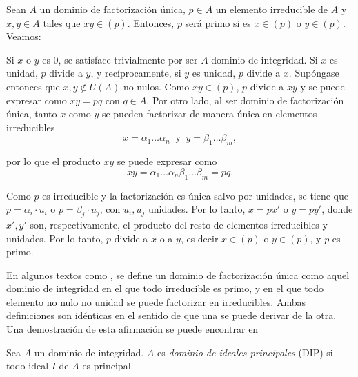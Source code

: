 \begin{prop}\end{prop}
\begin{dem}{\cite[p.~38]{Rosenberger}}
    Sean $A$ un dominio de factorización única, $p\in A$ un elemento irreducible de $A$ y $x,y\in A$ tales que $xy \in (p)$. Entonces, $p$ será primo si es $x \in (p)$ o $y \in (p)$. Veamos: 

    \item Si $x$ o $y$ es 0, se satisface trivialmente por ser $A$ dominio de integridad. Si $x$ es unidad, $p$ divide a $y$, y recíprocamente, si $y$ es unidad, $p$ divide a $x$. Supóngase entonces que $x,y\not\in U(A)$ no nulos. Como $xy \in (p)$, $p$ divide a $xy$ y se puede expresar como $xy = pq$ con $q\in A$. Por otro lado, al ser dominio de factorización única, tanto $x$ como $y$ se pueden factorizar de manera única en elementos irreducibles 
    \[x = \alpha_1 \ldots \alpha_n \ \text{ y }\ y = \beta_1 \ldots \beta_m ,\]

    por lo que el producto $xy$ se puede expresar como 
    \[xy = \alpha_1 \ldots \alpha_n\beta_1 \ldots \beta_m = pq.\]

    \item Como $p$ es irreducible y la factorización es única salvo por unidades, se tiene que $p = \alpha_i\cdot u_i$ o $p = \beta_j\cdot u_j$, con $u_i,u_j$ unidades. Por lo tanto, $x = px'$ o $y = py'$, donde $x',y'$ son, respectivamente, el producto del resto de elementos irreducibles y unidades. Por lo tanto, $p$ divide a $x$ o a $y$, es decir $x \in (p)$ o $y \in (p)$, y $p$ es primo.
\end{dem}
    


\begin{obs}
    En algunos textos como \cite{GamboaAnillos}, se define un dominio de factorización única como aquel dominio de integridad en el que todo irreducible es primo, y en el que todo elemento no nulo no unidad se puede factorizar en irreducibles. Ambas definiciones son idénticas en el sentido de que una se puede derivar de la otra. Una demostración de esta afirmación se puede encontrar en \cite[pp.~37-38]{Rosenberger}
\end{obs}

\begin{deff}{\cite[p.~39]{GamboaAnillos}}
    Sea $A$ un dominio de integridad. $A$ es \textit{dominio de ideales principales} (DIP) si todo ideal $I$ de $A$ es principal.
\end{deff}

